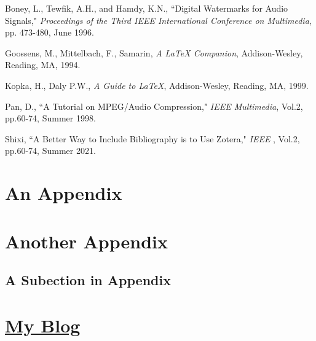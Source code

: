 \documentclass[11pt,oneside]{book}
\newcommand\myBlogUrl{http://schenax.student.ust.hk}
\begin{document}
%

\begin{thebibliography}{100}
	
	 Boney, L., Tewfik, A.H., and Hamdy, K.N., ``Digital
	Watermarks for Audio Signals," \emph{Proceedings of the Third IEEE
		International Conference on Multimedia}, pp. 473-480, June 1996.
	
	 Goossens, M., Mittelbach, F., Samarin, \emph{A LaTeX
		Companion}, Addison-Wesley, Reading, MA, 1994.
	
	 Kopka, H., Daly P.W., \emph{A Guide to LaTeX},
	Addison-Wesley, Reading, MA, 1999.
	
	 Pan, D., ``A Tutorial on MPEG/Audio Compression," \emph{IEEE
		Multimedia}, Vol.2, pp.60-74, Summer 1998.
	
	 Shixi, ``A Better Way to Include Bibliography is to Use Zotera," \emph{IEEE
		}, Vol.2, pp.60-74, Summer 2021.
	
\end{thebibliography}

\begin{appendices}
	\chapter{An Appendix}
	
	
	
	
	\chapter{Another Appendix}
	
	\section{A Subection in Appendix}
	
	\chapter{\href{\myBlogUrl}{\noindent My Blog \texorpdfstring{\small {}}{}}}
	
\end{appendices}
\end{document}
